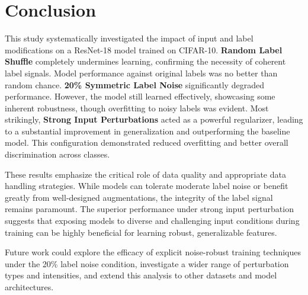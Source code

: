 \documentclass[10pt,twocolumn,letterpaper]{article}
\begin{document}
\section{Conclusion}
\label{sec:conclusion}

This study systematically investigated the impact of input and label modifications on a ResNet-18 model trained on CIFAR-10.
\textbf{Random Label Shuffle} completely undermines learning, confirming the necessity of coherent label signals. Model performance against original labels was no better than random chance.
\textbf{20\% Symmetric Label Noise} significantly degraded performance. However, the model still learned effectively, showcasing some inherent robustness, though overfitting to noisy labels was evident.
Most strikingly, \textbf{Strong Input Perturbations} acted as a powerful regularizer, leading to a substantial improvement in generalization and outperforming the baseline model. This configuration demonstrated reduced overfitting and better overall discrimination across classes.

These results emphasize the critical role of data quality and appropriate data handling strategies. While models can tolerate moderate label noise or benefit greatly from well-designed augmentations, the integrity of the label signal remains paramount. The superior performance under strong input perturbation suggests that exposing models to diverse and challenging input conditions during training can be highly beneficial for learning robust, generalizable features.

Future work could explore the efficacy of explicit noise-robust training techniques under the 20\% label noise condition, investigate a wider range of perturbation types and intensities, and extend this analysis to other datasets and model architectures.
\end{document}
